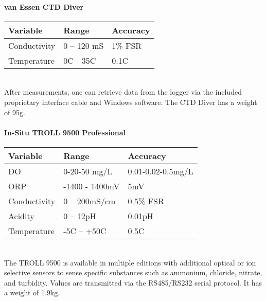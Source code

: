 \paragraph{van Essen CTD Diver}\mbox{} \cite{ctddiver}
\begin{table}[h!]
	\centering
	\quad
	\begin{tabular}{| l | l | l |}
    \hline
    Variable & Range & Accuracy\\
    \hline
    Conductivity & 0 – 120 mS & 1\% FSR\\
    Temperature & 0C - 35C & 0.1C\\
    \hline
	\end{tabular}
\end{table}
\\After measurements, one can retrieve data from the logger via the included proprietary interface cable and Windows software. The CTD Diver has a weight of 95g.
\newpage
\paragraph{In-Situ TROLL 9500 Professional}\mbox{} \cite{AP2000}
\begin{table}[h!]
	\centering
	\quad
	\begin{tabular}{| l | l | l |}
    \hline
    Variable & Range & Accuracy\\
    \hline
    DO & 0-20-50 mg/L & 0.01-0.02-0.5mg/L\\
    ORP & -1400 - 1400mV & 5mV\\
    Conductivity & 0 – 200mS/cm & 0.5\% FSR\\
    Acidity & 0 – 12pH & 0.01pH\\
    Temperature & -5C – +50C & 0.5C\\
    \hline
	\end{tabular}
\end{table}
\\The TROLL 9500 is available in multiple editions with additional optical or ion selective sensors to sense specific substances such as ammonium, chloride, nitrate, and turbidity. Values are transmitted via the RS485/RS232 serial protocol. It has a weight of 1.9kg.